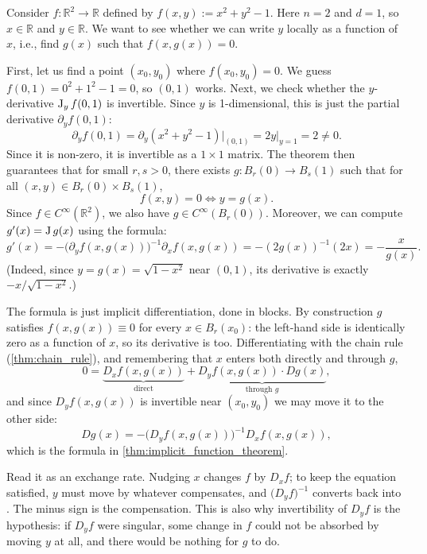 \begin{example}
\label{ex:implicit_function_circle}
Consider $f : \mathbb{R}^2 \to \mathbb{R}$ defined by $f(x,y) := x^2 + y^2 - 1$.
Here $n=2$ and $d=1$, so $x \in \mathbb{R}$ and $y \in \mathbb{R}$. We want to see whether we can write $y$ locally as a function of $x$, i.e., find $g(x)$ such that $f(x,g(x)) = 0$.

First, let us find a point $(x_0,y_0)$ where $f(x_0,y_0) = 0$. We guess $f(0,1) = 0^2+1^2-1 = 0$, so $(0,1)$ works.
Next, we check whether the $y$-derivative $\operatorname{J}_y f(0,1)$ is invertible. Since $y$ is 1-dimensional, this is just the partial derivative $\partial_y f(0,1)$:
\[\partial_y f(0,1) = \partial_y(x^2+y^2-1)\big|_{(0,1)} = 2y\big|_{y=1} = 2 \neq 0.\]
Since it is non-zero, it is invertible as a $1\times 1$ matrix.
The theorem then guarantees that for small $r, s > 0$, there exists $g : B_r(0) \to B_s(1)$ such that for all $(x,y) \in B_r(0)\times B_s(1)$,
\[f(x,y) = 0 \iff y = g(x).\]
Since $f \in C^\infty(\mathbb{R}^2)$, we also have $g \in C^\infty(B_r(0))$.
Moreover, we can compute $g'(x) = \operatorname{J} g(x)$ using the formula:
\[g'(x) = - \big(\partial_y f(x,g(x))\big)^{-1} \partial_x f(x,g(x)) = - (2g(x))^{-1} (2x) = -\frac{x}{g(x)}.\]
(Indeed, since $y=g(x) = \sqrt{1-x^2}$ near $(0,1)$, its derivative is exactly $-x/\sqrt{1-x^2}$.)
\end{example}

\begin{remark}
The formula is just implicit differentiation, done in blocks. By construction $g$ satisfies
$f(x,g(x)) \equiv 0$ for every $x \in B_r(x_0)$: the left-hand side is identically zero as a
function of $x$, so its derivative is too. Differentiating with the chain rule
(\cref{thm:chain_rule}), and remembering that $x$ enters both directly and through $g$,
\[0 = \underbrace{D_xf(x,g(x))}_{\text{direct}} + \underbrace{D_yf(x,g(x))\cdot Dg(x)}_{\text{through } g},\]
and since $D_yf(x,g(x))$ is invertible near $(x_0,y_0)$ we may move it to the other side:
\[Dg(x) = -\big(D_yf(x,g(x))\big)^{-1} D_xf(x,g(x)),\]
which is the formula in \cref{thm:implicit_function_theorem}.

Read it as an exchange rate. Nudging $x$ changes $f$ by $D_xf$; to keep the equation satisfied,
$y$ must move by whatever compensates, and $\big(D_yf\big)^{-1}$ converts 
back into . The minus sign is the compensation. This is also why
invertibility of $D_yf$ is the hypothesis: if $D_yf$ were singular, some change in $f$ could not
be absorbed by moving $y$ at all, and there would be nothing for $g$ to do.
\end{remark}

